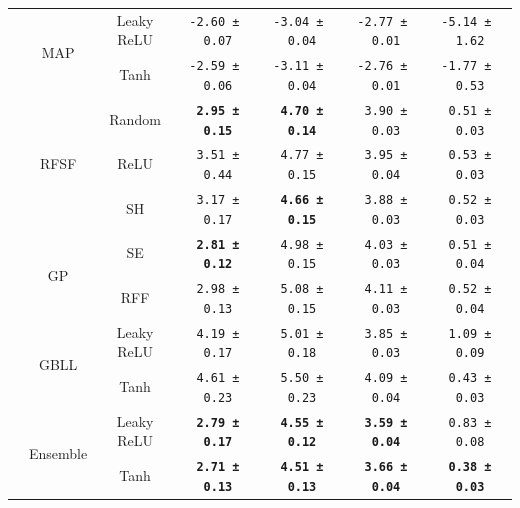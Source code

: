 {\begin{tabular}{c|cc|cccc}
		& \multirow[t]{2}{*}{\acs{MAP}}\superdagger  & Leaky \acs{ReLU} & \texttt{-2.60\,±\,0.07}          & \texttt{-3.04\,±\,0.04}          & \texttt{-2.77\,±\,0.01}          & \texttt{-5.14\,±\,1.62}          \\
		&                                            & Tanh             & \texttt{-2.59\,±\,0.06}          & \texttt{-3.11\,±\,0.04}          & \texttt{-2.76\,±\,0.01}          & \texttt{-1.77\,±\,0.53}          \\
		\midrule \multirow{11}{*}{\rotatebox{90}{\textbf{\acs{RMSE}}}}
		& \multirow[t]{3}{*}{\acs{RFSF}}             & Random           & \textbf{\texttt{~2.95\,±\,0.15}} & \textbf{\texttt{~4.70\,±\,0.14}} & \texttt{~3.90\,±\,0.03}          & \texttt{~0.51\,±\,0.03}          \\
		&                                            & \acs{ReLU}       & \texttt{~3.51\,±\,0.44}          & \texttt{~4.77\,±\,0.15}          & \texttt{~3.95\,±\,0.04}          & \texttt{~0.53\,±\,0.03}          \\
		&                                            & \acs{SH}         & \texttt{~3.17\,±\,0.17}          & \textbf{\texttt{~4.66\,±\,0.15}} & \texttt{~3.88\,±\,0.03}          & \texttt{~0.52\,±\,0.03}          \\
		& \multirow[t]{2}{*}{\acs{GP}}               & \acs{SE}         & \textbf{\texttt{~2.81\,±\,0.12}} & \texttt{~4.98\,±\,0.15}          & \texttt{~4.03\,±\,0.03}          & \texttt{~0.51\,±\,0.04}          \\
		&                                            & \acs{RFF}        & \texttt{~2.98\,±\,0.13}          & \texttt{~5.08\,±\,0.15}          & \texttt{~4.11\,±\,0.03}          & \texttt{~0.52\,±\,0.04}          \\
		& \multirow[t]{2}{*}{\acs{GBLL}}\superdagger & Leaky \acs{ReLU} & \texttt{~4.19\,±\,0.17}          & \texttt{~5.01\,±\,0.18}          & \texttt{~3.85\,±\,0.03}          & \texttt{~1.09\,±\,0.09}          \\
		&                                            & Tanh             & \texttt{~4.61\,±\,0.23}          & \texttt{~5.50\,±\,0.23}          & \texttt{~4.09\,±\,0.04}          & \texttt{~0.43\,±\,0.03}          \\
		& \multirow[t]{2}{*}{Ensemble}\superdagger   & Leaky \acs{ReLU} & \textbf{\texttt{~2.79\,±\,0.17}} & \textbf{\texttt{~4.55\,±\,0.12}} & \textbf{\texttt{~3.59\,±\,0.04}} & \texttt{~0.83\,±\,0.08}          \\
		&                                            & Tanh             & \textbf{\texttt{~2.71\,±\,0.13}} & \textbf{\texttt{~4.51\,±\,0.13}} & \textbf{\texttt{~3.66\,±\,0.04}} & \textbf{\texttt{~0.38\,±\,0.03}} \\

\end{tabular}}
